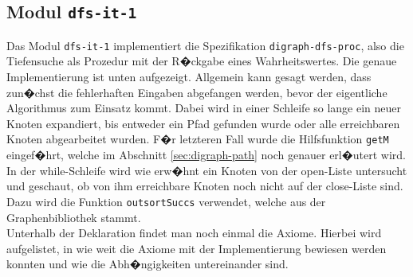 ﻿\subsection{Modul \texttt{dfs-it-1}}
\label{sec:dfs-it-1}

Das Modul \texttt{dfs-it-1} implementiert die Spezifikation \texttt{digraph-dfs-proc}, also die Tiefensuche als Prozedur mit der R�ckgabe eines Wahrheitswertes. Die genaue Implementierung ist unten aufgezeigt. Allgemein kann gesagt werden, dass zun�chst die fehlerhaften Eingaben abgefangen werden, bevor der eigentliche Algorithmus zum Einsatz kommt. Dabei wird in einer Schleife so lange ein neuer Knoten expandiert, bis entweder ein Pfad gefunden wurde oder alle erreichbaren Knoten abgearbeitet wurden. F�r letzteren Fall wurde die Hilfsfunktion \texttt{getM} eingef�hrt, welche im Abschnitt \ref{sec:digraph-path} noch genauer erl�utert wird. In der while-Schleife wird wie erw�hnt ein Knoten von der open-Liste untersucht und geschaut, ob von ihm erreichbare Knoten noch nicht auf der close-Liste sind. Dazu wird die Funktion \texttt{outsortSuccs} verwendet, welche aus der Graphenbibliothek stammt.\\
Unterhalb der Deklaration findet man noch einmal die Axiome. Hierbei wird aufgelistet, in wie weit die Axiome mit der Implementierung bewiesen werden konnten und wie die Abh�ngigkeiten untereinander sind. 

